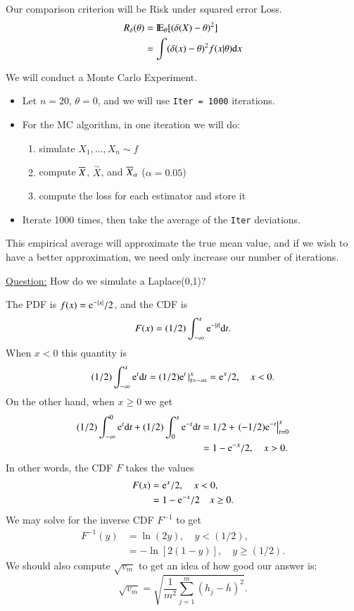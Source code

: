 \documentclass[11pt,english]{scrbook}
\begin{document}
Our comparison criterion will be Risk under squared error Loss. 
\begin{align*}
R_{\delta}(\theta) & =\mathrm{I\hspace{-1.5pt}E}_{\theta}[(\delta(X)-\theta)^{2}]\\
 & =\int(\delta(x)-\theta)^{2}f(x|\theta)\mathrm{d} x
\end{align*}

We will conduct a Monte Carlo Experiment.

\begin{itemize}
\item Let \(n=20\), \(\theta=0\), and we will use \texttt{Iter = 1000} iterations.
\item For the MC algorithm, in one iteration we will do:
\begin{enumerate}
\item simulate \(X_{1},\ldots,X_{n}\sim f\)
\item compute \(\overline{X}\), \(\overset{\sim}{X}\), and \(\overline{X}_{\alpha}\) (\(\alpha=0.05\))
\item compute the loss for each estimator and store it
\end{enumerate}
\item Iterate 1000 times, then take the average of the \texttt{Iter} deviations.
\end{itemize}

This empirical average will approximate the true mean value, and if we wish to have a better approximation, we need only increase our number of iterations.

\uline{Question:} How do we simulate a Laplace(0,1)?

The PDF is \(f(x) = \mathrm{e}^{-|x|}/2\), and the CDF is 
\[
F(x)=(1/2)\int_{-\infty}^{x} \mathrm{e}^{-|t|}\mathrm{d} t.
\]
When \(x < 0\) this quantity is 
\[
(1/2)\int_{-\infty}^{x}\mathrm{e}^{t}\mathrm{d} t=(1/2)\mathrm{e}^{t}\,|_{t=-\infty}^{x} = \mathrm{e}^{x}/2,\quad x < 0.\]
On the other hand, when \(x \geq 0\) we get 
\begin{align*}
(1/2)\int_{-\infty}^{0}\mathrm{e}^{t}\mathrm{d} t+(1/2)\int_{0}^{x}\mathrm{e}^{-t}\mathrm{d} t & =1/2+\left.(-1/2)\mathrm{e}^{-t}\right|_{t=0}^{x}\\
 & =1-\mathrm{e}^{-x}/2,\quad x>0.
\end{align*}
In other words, the CDF \(F\) takes the values 
\begin{align*}
F(x) & =\mathrm{e}^{x}/2,\quad x < 0,\\
 & =1 - \mathrm{e}^{-x}/2\quad x \geq 0.
\end{align*}
We may solve for the inverse CDF \(F^{-1}\) to get 
\begin{align*}
F^{-1}(y) & =\ln(2y),\quad y < (1/2),\\
 & =-\ln[2(1-y)],\quad y\geq (1/2).
\end{align*}
 We should also compute \(\sqrt{v_{m}}\) to get an idea of how good
our answer is: 
\[
\sqrt{v_{m}}=\sqrt{\frac{1}{m^{2}}\sum_{j=1}^{m}(h_{j}-\overline{h})^{2}}.
\]
\end{document}
